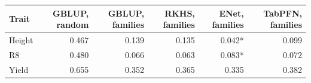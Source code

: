 \begin{tabular}{lrrrrr}
\toprule
Trait & GBLUP, random & GBLUP, families & RKHS, families & ENet, families & TabPFN, families \\
\midrule
Height & 0.467 & 0.139 & 0.135 & 0.042* & 0.099 \\
R8 & 0.480 & 0.066 & 0.063 & 0.083* & 0.072 \\
Yield & 0.655 & 0.352 & 0.365 & 0.335 & 0.382 \\
\bottomrule
\end{tabular}

